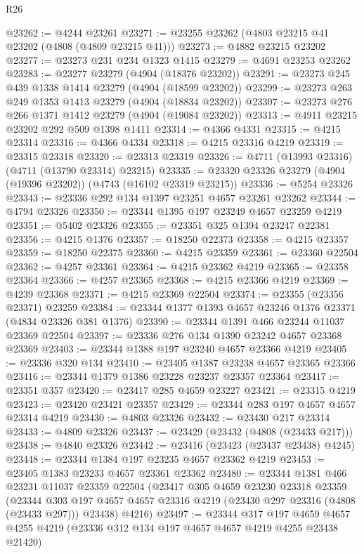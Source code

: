 \begin{lexlean}{R26}
\begin{coremodule}
@23262 := @4244 @23261
@23271 := @23255 @23262 (@4803 @23215 @41 @23202 (@4808 (@4809 @23215 @41)))
@23273 := @4882 @23215 @23202
@23277 := @23273 @231 @234 @1323 @1415
@23279 := @4691 @23253 @23262
@23283 := @23277 @23279 (@4904 (@18376 @23202))
@23291 := @23273 @245 @439 @1338 @1414 @23279 (@4904 (@18599 @23202))
@23299 := @23273 @263 @249 @1353 @1413 @23279 (@4904 (@18834 @23202))
@23307 := @23273 @276 @266 @1371 @1412 @23279 (@4904 (@19084 @23202))
@23313 := @4911 @23215 @23202 @292 @509 @1398 @1411
@23314 := @4366 @4331
@23315 := @4215 @23314
@23316 := @4366 @4334
@23318 := @4215 @23316 @4219
@23319 := @23315 @23318
@23320 := @23313 @23319
@23326 := @4711 (@13993 @23316) (@4711 (@13790 @23314) @23215)
@23335 := @23320 @23326 @23279 (@4904 (@19396 @23202)) (@4743 (@16102 @23319 @23215))
@23336 := @5254 @23326
@23343 := @23336 @292 @134 @1397 @23251 @4657 @23261 @23262
@23344 := @4794 @23326
@23350 := @23344 @1395 @197 @23249 @4657 @23259 @4219
@23351 := @5402 @23326
@23355 := @23351 @325 @1394 @23247 @22381
@23356 := @4215 @1376
@23357 := @18250 @22373
@23358 := @4215 @23357
@23359 := @18250 @22375
@23360 := @4215 @23359
@23361 := @23360 @22504
@23362 := @4257 @23361
@23364 := @4215 @23362 @4219
@23365 := @23358 @23364
@23366 := @4257 @23365
@23368 := @4215 @23366 @4219
@23369 := @4239 @23368
@23371 := @4215 @23369 @22504
@23374 := @23355 (@23356 @23371) @23259
@23384 := @23344 @1377 @1393 @4657 @23246 @1376 @23371 (@4834 @23326 @381 @1376)
@23390 := @23344 @1391 @466 @23244 @11037 @23369 @22504
@23397 := @23336 @276 @134 @1390 @23242 @4657 @23368 @23369
@23403 := @23344 @1388 @197 @23240 @4657 @23366 @4219
@23405 := @23336 @320 @134
@23410 := @23405 @1387 @23238 @4657 @23365 @23366
@23416 := @23344 @1379 @1386 @23228 @23237 @23357 @23364
@23417 := @23351 @357
@23420 := @23417 @285 @4659 @23227
@23421 := @23315 @4219
@23423 := @23420 @23421 @23357
@23429 := @23344 @283 @197 @4657 @4657 @23314 @4219
@23430 := @4803 @23326
@23432 := @23430 @217 @23314
@23433 := @4809 @23326
@23437 := @23429 (@23432 (@4808 (@23433 @217)))
@23438 := @4840 @23326
@23442 := @23416 (@23423 (@23437 @23438) @4245)
@23448 := @23344 @1384 @197 @23235 @4657 @23362 @4219
@23453 := @23405 @1383 @23233 @4657 @23361 @23362
@23480 := @23344
    @1381
    @466
    @23231
    @11037
    @23359
    @22504
    (@23417
      @305
      @4659
      @23230
      @23318
      @23359
      (@23344 @303 @197 @4657 @4657 @23316 @4219 (@23430 @297 @23316 (@4808 (@23433 @297))) @23438)
      @4216)
@23497 := @23344
    @317
    @197
    @4659
    @4657
    @4255
    @4219
    (@23336 @312 @134 @197 @4657 @4657 @4219 @4255 @23438 @21420)

\end{coremodule}
\end{lexlean}

